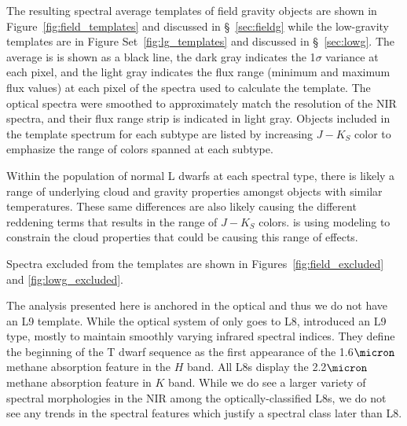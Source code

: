 \documentclass[12pt,preprint]{aastex}
\begin{document}
The resulting spectral average templates of field gravity objects are shown in Figure~\ref{fig:field_templates} and discussed in \S~\ref{sec:fieldg} while the low-gravity templates are in Figure Set~\ref{fig:lg_templates} and discussed in \S~\ref{sec:lowg}. 
The average is is shown as a black line, the dark gray indicates the 1$\sigma$ variance at each pixel, and the light gray indicates the flux range (minimum and maximum flux values) at each pixel of the spectra used to calculate the template. 
The optical spectra were smoothed to approximately match the resolution of the NIR spectra, and their flux range strip is indicated in light gray.
Objects included in the template spectrum for each subtype are listed by increasing $J-K_S$ color to emphasize the range of colors spanned at each subtype.

Within the population of normal L dwarfs at each spectral type, there is likely a range of underlying cloud and gravity properties amongst objects with similar temperatures.
These same differences are also likely causing the different reddening terms that results in the range of $J-K_S$ colors. \citet{Hiranaka13,Marocco:2014kr} is using modeling to constrain the cloud properties that could be causing this range of effects.

Spectra excluded from the templates are shown in Figures~\ref{fig:field_excluded} and \ref{fig:lowg_excluded}.


The analysis presented here is anchored in the optical and thus we do not have an L9 template.
While the optical system of \cite{K99} only goes to L8, \cite{Geballe02} introduced an L9 type, mostly to maintain smoothly varying infrared spectral indices.
They define the beginning of the T dwarf sequence as the first appearance of the 1.6$\micron$ methane absorption feature in the $H$ band.
All L8s display the 2.2$\micron$ methane absorption feature in $K$ band.
While we do see a larger variety of spectral morphologies in the NIR among the optically-classified L8s, we do not see any trends in the spectral features which justify a spectral class later than L8.

\end{document}
